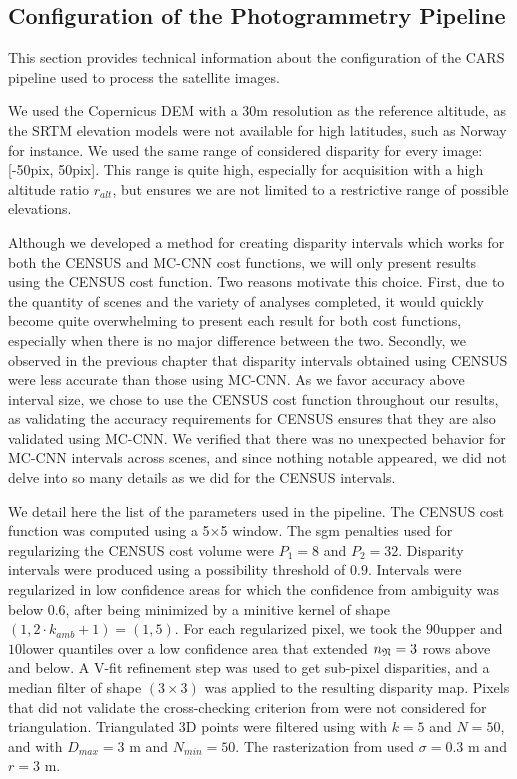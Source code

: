 \subsection{Configuration of the Photogrammetry Pipeline}
This section provides technical information about the configuration of the CARS pipeline used to process the satellite images.

We used the Copernicus DEM with a 30m resolution as the reference altitude, as the SRTM elevation models were not available for high latitudes, such as Norway for instance. We used the same range of considered disparity for every image: [-50pix, 50pix]. This range is quite high, especially for acquisition with a high altitude ratio $r_{alt}$, but ensures we are not limited to a restrictive range of possible elevations.

Although we developed a method for creating disparity intervals which works for both the CENSUS and MC-CNN cost functions, we will only present results using the CENSUS cost function. Two reasons motivate this choice. First, due to the quantity of scenes and the variety of analyses completed, it would quickly become quite overwhelming to present each result for both cost functions, especially when there is no major difference between the two. Secondly, we observed in the previous chapter that disparity intervals obtained using CENSUS were less accurate than those using MC-CNN. As we favor accuracy above interval size, we chose to use the CENSUS cost function throughout our results, as validating the accuracy requirements for CENSUS ensures that they are also validated using MC-CNN. We verified that there was no unexpected behavior for MC-CNN intervals across scenes, and since nothing notable appeared, we did not delve into so many details as we did for the CENSUS intervals.  

We detail here the list of the parameters used in the pipeline. The CENSUS cost function was computed using a 5$\times$5 window. The \acrshort{sgm} penalties used for regularizing the CENSUS cost volume were $P_1=8$ and $P_2=32$. Disparity intervals were produced using a possibility threshold of $0.9$. Intervals were regularized in low confidence areas for which the confidence from ambiguity was below $0.6$, after being minimized by a minitive kernel of shape $(1, 2\cdot k_{amb}+1)=(1,5)$. For each regularized pixel, we took the $90$\ith upper and $10$\ith lower quantiles over a low confidence area that extended $n_{\mathfrak{N}}=3$ rows above and below. A V-fit refinement step was used to get sub-pixel disparities, and a median filter of shape $(3\times 3)$ was applied to the resulting disparity map. Pixels that did not validate the cross-checking criterion from  were not considered for triangulation. Triangulated 3D points were filtered using  with $k=5$ and $N=50$, and  with $D_{max}=3$ m and $N_{min}=50$. The rasterization from  used $\sigma=0.3$ m and $r=3$ m.


